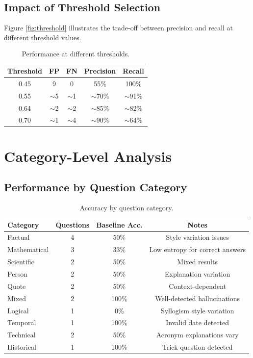 \subsection{Impact of Threshold Selection}

Figure \ref{fig:threshold} illustrates the trade-off between precision and recall at different threshold values.

\begin{table}[!htbp]
    \centering
    \caption{Performance at different thresholds.}
    \label{tab:thresholds}
    \begin{tabular}{ccccc}
        \toprule
        Threshold & FP & FN & Precision & Recall \\
        \midrule
        0.45 & 9 & 0 & 55\% & 100\% \\
        0.55 & $\sim$5 & $\sim$1 & $\sim$70\% & $\sim$91\% \\
        0.64 & $\sim$2 & $\sim$2 & $\sim$85\% & $\sim$82\% \\
        0.70 & $\sim$1 & $\sim$4 & $\sim$90\% & $\sim$64\% \\
        \bottomrule
    \end{tabular}
\end{table}

\section{Category-Level Analysis}

\subsection{Performance by Question Category}

\begin{table}[!htbp]
    \centering
    \caption{Accuracy by question category.}
    \label{tab:category_perf}
    \begin{tabular}{lccc}
        \toprule
        Category & Questions & Baseline Acc. & Notes \\
        \midrule
        Factual & 4 & 50\% & Style variation issues \\
        Mathematical & 3 & 33\% & Low entropy for correct answers \\
        Scientific & 2 & 50\% & Mixed results \\
        Person & 2 & 50\% & Explanation variation \\
        Quote & 2 & 50\% & Context-dependent \\
        Mixed & 2 & 100\% & Well-detected hallucinations \\
        Logical & 1 & 0\% & Syllogism style variation \\
        Temporal & 1 & 100\% & Invalid date detected \\
        Technical & 2 & 50\% & Acronym explanations vary \\
        Historical & 1 & 100\% & Trick question detected \\
        \bottomrule
    \end{tabular}
\end{table}

